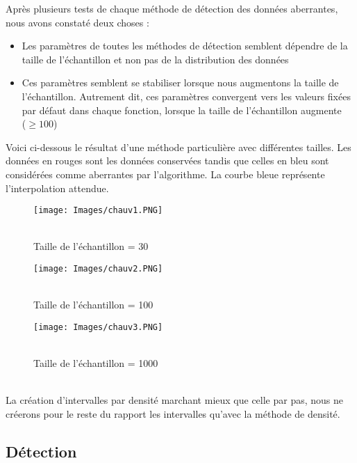 \documentclass[a4paper,12pt]{article} %
\begin{document}
        Après plusieurs tests de chaque méthode de détection des données aberrantes, nous avons constaté deux choses :
        \begin{itemize}
        \item Les paramètres de toutes les méthodes de détection semblent dépendre de la taille de l’échantillon et non pas de la distribution des données 
        \item Ces paramètres semblent se stabiliser lorsque nous augmentons la taille de l’échantillon. Autrement dit, ces paramètres convergent vers les valeurs fixées par défaut dans chaque fonction, lorsque la taille de l’échantillon augmente \\($\ge 100 $)
        \end{itemize}
        Voici ci-dessous le résultat d'une méthode particulière avec différentes tailles. Les données en rouges sont les données conservées tandis que celles en bleu sont considérées comme aberrantes par l'algorithme. La courbe bleue représente l'interpolation attendue.
        \begin{figure}[H] %
        \texttt{[image: Images/chauv1.PNG]} %
        \caption{\\Taille de l’échantillon = 30} %
        \label{m15} %
        \endminipage
        \texttt{[image: Images/chauv2.PNG]}  
        \caption{\\Taille de l’échantillon = 100}
        \label{m5}
        \endminipage
        \texttt{[image: Images/chauv3.PNG]}  
        \caption{\\Taille de l’échantillon = 1000}
        \label{m35}
        \endminipage
        
        \end{figure}
        \\
            La création d'intervalles par densité marchant mieux que celle par pas, nous ne créerons pour le reste du rapport les intervalles qu'avec la méthode de densité.\\
        
        \subsection{Détection}
            
\end{document}
